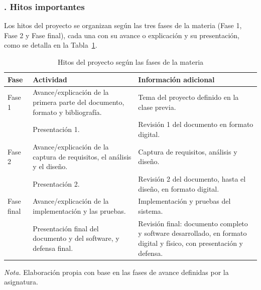 \clearpage
\subsubsection{. Hitos importantes}\label{sec:hitos_importantes}

Los hitos del proyecto se organizan según las tres fases de la materia (Fase 1, Fase 2 y Fase final), cada una con su avance o explicación y su presentación, como se detalla en la Tabla~\ref{tab:hitos}.

\begin{table}[H]
\caption{Hitos del proyecto según las fases de la materia}
\label{tab:hitos}
\begin{threeparttable}
\begin{tabular}{>{\raggedright\arraybackslash}p{2cm} >{\raggedright\arraybackslash}p{5cm} >{\raggedright\arraybackslash}p{5.5cm}}
\toprule
Fase & Actividad & Información adicional \\
\midrule
Fase 1 & Avance/explicación de la primera parte del documento, formato y bibliografía. & Tema del proyecto definido en la clase previa. \\
 & Presentación 1. & Revisión 1 del documento en formato digital. \\
\midrule
Fase 2 & Avance/explicación de la captura de requisitos, el análisis y el diseño. & Captura de requisitos, análisis y diseño. \\
 & Presentación 2. & Revisión 2 del documento, hasta el diseño, en formato digital. \\
\midrule
Fase final & Avance/explicación de la implementación y las pruebas. & Implementación y pruebas del sistema. \\
 & Presentación final del documento y del software, y defensa final. & Revisión final: documento completo y software desarrollado, en formato digital y físico, con presentación y defensa. \\
\bottomrule
\end{tabular}
\begin{tablenotes}
\item \textit{Nota.} Elaboración propia con base en las fases de avance definidas por la asignatura.
\end{tablenotes}
\end{threeparttable}
\end{table}
